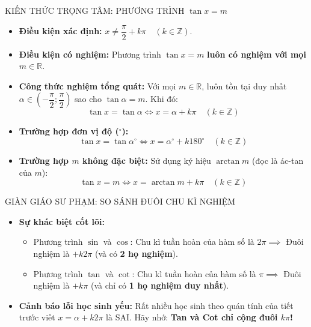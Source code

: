 \documentclass[12pt, a4paper]{article}
\begin{document}
\begin{pedabox}{KIẾN THỨC TRỌNG TÂM: PHƯƠNG TRÌNH $\tan x = m$}  
\begin{itemize}[leftmargin=0.6cm]  
    \item \textbf{Điều kiện xác định:} $x \neq \dfrac{\pi}{2} + k\pi \quad (k \in \mathbb{Z})$.  
    \item \textbf{Điều kiện có nghiệm:} Phương trình $\tan x = m$ \textbf{luôn có nghiệm với mọi $m \in \mathbb{R}$}.  
    \item \textbf{Công thức nghiệm tổng quát:}  
    Với mọi $m \in \mathbb{R}$, luôn tồn tại duy nhất $\alpha \in \left(-\dfrac{\pi}{2}; \dfrac{\pi}{2}\right)$ sao cho $\tan\alpha = m$. Khi đó:  
    $$\tan x = \tan\alpha \iff x = \alpha + k\pi \quad (k \in \mathbb{Z})$$  
    \item \textbf{Trường hợp đơn vị độ ($^\circ$):}  
    $$\tan x = \tan\alpha^\circ \iff x = \alpha^\circ + k180^\circ \quad (k \in \mathbb{Z})$$  
    \item \textbf{Trường hợp $m$ không đặc biệt:} Sử dụng ký hiệu $\arctan m$ (đọc là ác-tan của $m$):  
    $$\tan x = m \iff x = \arctan m + k\pi \quad (k \in \mathbb{Z})$$  
\end{itemize}  
\end{pedabox}  
  
\begin{scaffoldbox}{GIÀN GIÁO SƯ PHẠM: SO SÁNH ĐUÔI CHU KÌ NGHIỆM}  
\begin{itemize}[leftmargin=0.6cm]  
    \item \textbf{Sự khác biệt cốt lõi:}  
    \begin{itemize}  
        \item Phương trình $\sin$ và $\cos$: Chu kì tuần hoàn của hàm số là $2\pi \implies$ Đuôi nghiệm là $+ k2\pi$ (và có \textbf{2 họ nghiệm}).  
        \item Phương trình $\tan$ và $\cot$: Chu kì tuần hoàn của hàm số là $\pi \implies$ Đuôi nghiệm là $+ k\pi$ (và chỉ có \textbf{1 họ nghiệm duy nhất}).  
    \end{itemize}  
    \item \textbf{Cảnh báo lỗi học sinh yếu:} Rất nhiều học sinh theo quán tính của tiết trước viết $x = \alpha + k2\pi$ là SAI. Hãy nhớ: \textbf{Tan và Cot chỉ cộng đuôi $k\pi$!}  
\end{itemize}  
\end{scaffoldbox}  
  
\end{document}
